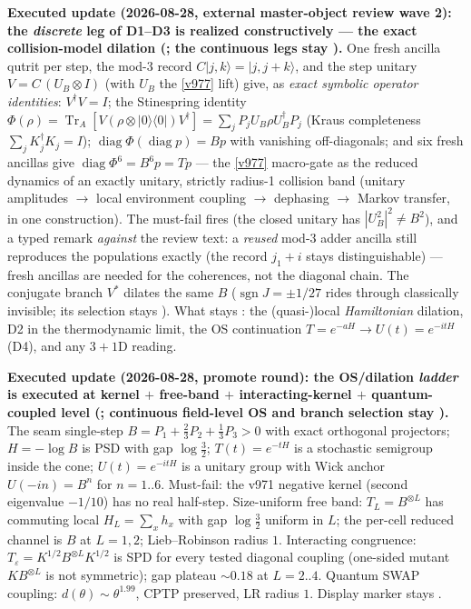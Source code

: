 \par\smallskip\noindent\textbf{Executed update (2026-08-28, external master-object review wave
2): the \emph{discrete} leg of D1--D3 is realized constructively --- the exact collision-model
dilation (; the continuous legs stay \mO).}  One fresh
ancilla qutrit per step, the mod-3 record $C|j,k\rangle=|j,j{+}k\rangle$, and the step unitary
$V=C\,(U_B\otimes I)$ (with $U_B$ the \vref{v977} lift) give, as \emph{exact symbolic operator
identities}: $V^\dagger V=I$; the Stinespring identity
$\Phi(\rho)=\operatorname{Tr}_A[V(\rho\otimes|0\rangle\langle0|)V^\dagger]
=\sum_jP_jU_B\rho U_B^\dagger P_j$ (Kraus completeness $\sum_jK_j^\dagger K_j=I$);
$\operatorname{diag}\Phi(\operatorname{diag}p)=Bp$ with vanishing off-diagonals; and six fresh
ancillas give $\operatorname{diag}\Phi^6=B^6p=Tp$ --- the \vref{v977} macro-gate as the reduced
dynamics of an exactly unitary, strictly radius-1 collision band (unitary amplitudes
$\to$ local environment coupling $\to$ dephasing $\to$ Markov transfer, in one construction).
The must-fail fires (the closed unitary has $|U_B^2|^2\neq B^2$), and a typed remark
\emph{against} the review text: a \emph{reused} mod-3 adder ancilla still reproduces the
populations exactly (the record $j_1{+}i$ stays distinguishable) --- fresh ancillas are needed
for the coherences, not the diagonal chain.  The conjugate branch $V^*$ dilates the same $B$
($\operatorname{sgn}J=\pm1/27$ rides through classically invisible; its selection stays \mO).
What stays \mO: the (quasi-)local \emph{Hamiltonian} dilation, D2 in the thermodynamic limit,
the OS continuation $T=e^{-aH}\to U(t)=e^{-itH}$ (D4), and any $3{+}1$D reading.

\par\smallskip\noindent\textbf{Executed update (2026-08-28, promote round): the OS/dilation
\emph{ladder} is executed at kernel $+$ free-band $+$ interacting-kernel $+$ quantum-coupled
level (; continuous
field-level OS and branch selection stay \mO).}
The seam single-step $B=P_1+\tfrac23 P_2+\tfrac13 P_3>0$ with exact orthogonal projectors;
$H=-\log B$ is PSD with gap $\log\tfrac32$; $T(t)=e^{-tH}$ is a stochastic semigroup inside
the cone; $U(t)=e^{-itH}$ is a unitary group with Wick anchor $U(-in)=B^n$ for $n=1..6$.
Must-fail: the v971 negative kernel (second eigenvalue $-1/10$) has no real half-step.
Size-uniform free band: $T_L=B^{\otimes L}$ has commuting local $H_L=\sum_x h_x$ with gap
$\log\tfrac32$ uniform in $L$; the per-cell reduced channel is $B$ at $L=1,2$; Lieb--Robinson
radius $1$.  Interacting congruence: $T_\varepsilon=K^{1/2}B^{\otimes L}K^{1/2}$ is SPD for
every tested diagonal coupling (one-sided mutant $KB^{\otimes L}$ is not symmetric); gap
plateau $\sim0.18$ at $L=2..4$.  Quantum SWAP coupling: $d(\theta)\sim\theta^{1.99}$, CPTP
preserved, LR radius $1$.  Display marker stays \mO.

